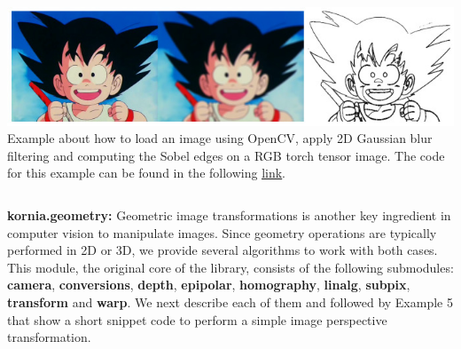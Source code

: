 \begin{tcolorbox}[every float=\centering, drop shadow, title=Example 4: Image filtering and Edge detection]
    \label{fig:examples:filters}
    \includegraphics[width=1.\linewidth]{main/chapter03/data/examples/goku_filters.jpg}
    {Example about how to load an image using OpenCV, apply  2D Gaussian blur filtering and computing the Sobel edges on a RGB torch tensor image. The code for this example can be found in the following \underline{\color{blue}\href{https://colab.research.google.com/drive/1IiNHo5TjgQShrI7XoMOtam3PyZ9FNToh}{link}}.}
    \inputminted[python3, baselinestretch=1., style=vs, fontfamily=courier, fontsize=\footnotesize, funcnamehighlighting=true]{python}{main/chapter03/data/examples/snipet_filters.py}
\end{tcolorbox}

\newpage

\noindent\textbf{kornia.geometry:} Geometric image transformations is another key ingredient in computer vision to manipulate images. Since geometry operations are typically performed in 2D or 3D,  we provide several algorithms to work with both cases. This module, the original core of the library, consists of the following submodules: \textbf{camera}, \textbf{conversions}, \textbf{depth}, \textbf{epipolar}, \textbf{homography}, \textbf{linalg}, \textbf{subpix}, \textbf{transform} and \textbf{warp}. We next describe each of them and followed by Example 5 that show a short snippet code to perform a simple image perspective transformation.

